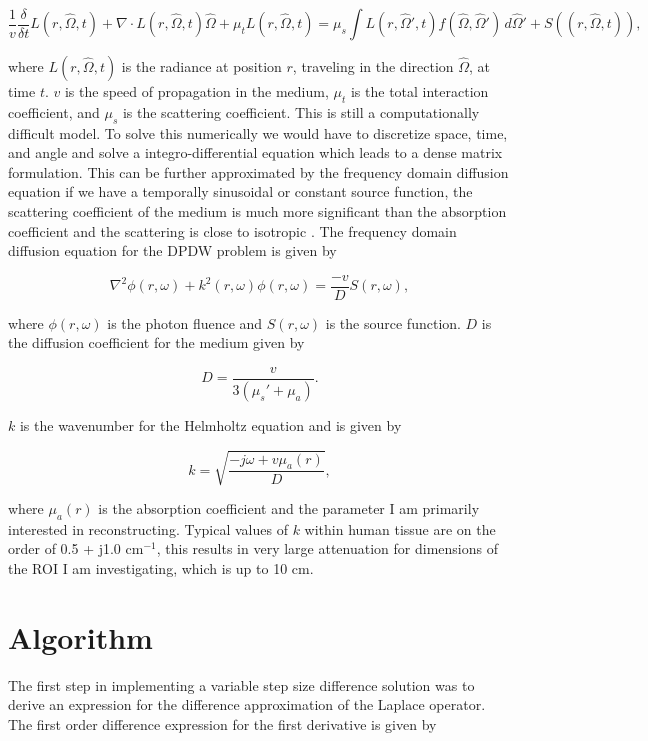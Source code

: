 \documentclass [11 pt, titlepage]{article}
\begin{document}
\begin {displaymath}
\frac{1}{v} \frac{\delta}{\delta t} L(r,\hat{\Omega},t) + 
\nabla \cdot L(r,\hat{\Omega},t)\hat{\Omega} +
\mu_t L(r,\hat{\Omega},t) = \mu_s 
\int L(r,\hat{\Omega}',t)f(\hat{\Omega}, \hat{\Omega}') \, d\hat{\Omega}'
+ S((r,\hat{\Omega},t)),
\end {displaymath}

where $L(r,\hat{\Omega},t)$ is the radiance at position $r$, traveling
in the direction $\hat{\Omega}$, at time $t$. $v$ is the speed of
propagation in the medium, $\mu_t$ is the total interaction
coefficient, and $\mu_s$ is the scattering coefficient. This is still a
computationally difficult model.  To solve this numerically we would
have to discretize space, time, and angle and solve a
integro-differential equation which leads to a dense matrix
formulation.  This can be further approximated by the frequency domain
diffusion equation if we have a temporally sinusoidal or constant source
function, the scattering coefficient of the medium is much more
significant than the absorption coefficient and the scattering is
close to isotropic \cite{Boas:96}.  The frequency
domain diffusion equation for the DPDW problem is given by

\begin {displaymath}
\nabla^2 \phi(r, \omega) + k^2(r, \omega)\phi(r, \omega) =
\frac{-v}{D}S(r, \omega),
\end {displaymath}

where $\phi(r, \omega)$ is the photon fluence and $S(r, \omega)$ is
the source function.  $D$ is the diffusion coefficient for the medium
given by

\begin {displaymath}
D = \frac {v} {3(\mu_s' + \mu_a)}.
\end {displaymath}

$k$ is the wavenumber for the Helmholtz equation and is given by

\begin {displaymath}
k = \sqrt{\frac {-j\omega+v\mu_a(r)} {D}},
\end {displaymath}

where $\mu_a(r)$ is the absorption coefficient and the parameter I am
primarily interested in reconstructing.  Typical values of $k$ within
human tissue are on the order of 0.5 + j1.0 cm$^{-1}$, this results in very
large attenuation for dimensions of the ROI I am investigating, which
is up to 10 cm.


\section{Algorithm}
\vspace {-4ex}
The first step in implementing a variable step size difference
solution was to derive an expression for the difference approximation
of the Laplace operator.  The first order difference expression for
the first derivative is given by
\end{document}
